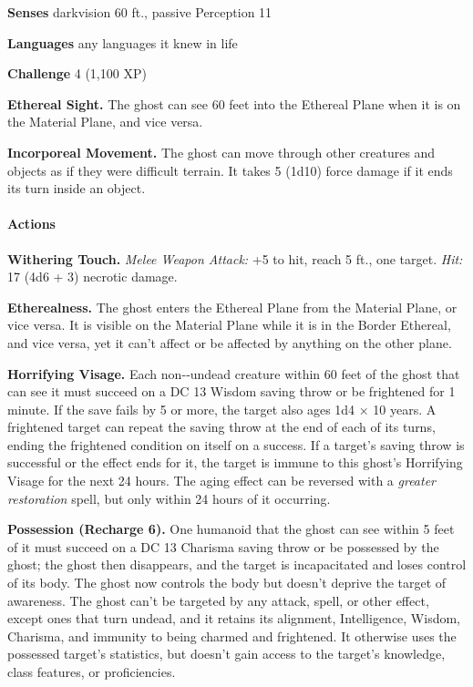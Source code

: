 \documentclass[
]{article}
\begin{document}
\textbf{Senses} darkvision 60 ft., passive Perception 11

\textbf{Languages} any languages it knew in life

\textbf{Challenge} 4 (1,100 XP)

\textbf{Ethereal Sight.} The ghost can see 60 feet into the Ethereal
Plane when it is on the Material Plane, and vice versa.

\textbf{Incorporeal Movement.} The ghost can move through other
creatures and objects as if they were difficult terrain. It takes 5
(1d10) force damage if it ends its turn inside an object.

\hypertarget{actions-3}{%
\paragraph{Actions}\label{actions-3}}

\textbf{Withering Touch.} \emph{Melee Weapon Attack:} +5 to hit, reach 5
ft., one target. \emph{Hit:} 17 (4d6 + 3) necrotic damage.

\textbf{Etherealness.} The ghost enters the Ethereal Plane from the
Material Plane, or vice versa. It is visible on the Material Plane while
it is in the Border Ethereal, and vice versa, yet it can't affect or be
affected by anything on the other plane.

\textbf{Horrifying Visage.} Each non-­‐undead creature within 60 feet of
the ghost that can see it must succeed on a DC 13 Wisdom saving throw or
be frightened for 1 minute. If the save fails by 5 or more, the target
also ages 1d4 × 10 years. A frightened target can repeat the saving
throw at the end of each of its turns, ending the frightened condition
on itself on a success. If a target's saving throw is successful or the
effect ends for it, the target is immune to this ghost's Horrifying
Visage for the next 24 hours. The aging effect can be reversed with a
\emph{greater restoration} spell, but only within 24 hours of it
occurring.

\textbf{Possession (Recharge 6).} One humanoid that the ghost can see
within 5 feet of it must succeed on a DC 13 Charisma saving throw or be
possessed by the ghost; the ghost then disappears, and the target is
incapacitated and loses control of its body. The ghost now controls the
body but doesn't deprive the target of awareness. The ghost can't be
targeted by any attack, spell, or other effect, except ones that turn
undead, and it retains its alignment, Intelligence, Wisdom, Charisma,
and immunity to being charmed and frightened. It otherwise uses the
possessed target's statistics, but doesn't gain access to the target's
knowledge, class features, or proficiencies.
\end{document}
